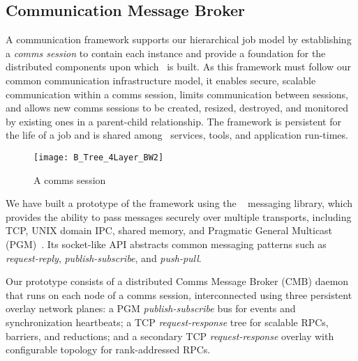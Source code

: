 \subsection{Communication Message Broker}

A communication framework supports our hierarchical job model
by establishing a {\em comms session} to contain each \flux instance
and provide a foundation for the distributed components upon which
\flux\ is built.
As this framework must follow our common communication infrastructure
model, it enables secure, scalable communication
within a comms session, limits communication between sessions,
and allows new comms sessions to be created, resized, destroyed,
and monitored by existing ones in a parent-child relationship.
The framework is persistent for the life of a \flux job and is 
shared among \flux\ services, tools, and application run-times.

\begin{figure}
\centering
\texttt{[image: B\_Tree\_4Layer\_BW2]}
\vspace{.8cm}
\caption{A comms session} 
\vspace{-.5cm}
\label{fig:commswireup}
\end{figure}

We have built a prototype of the framework using the \zMQ~\cite{ZMQGuide}
messaging library, which provides the ability to pass messages securely
over multiple transports, including TCP, UNIX domain IPC, shared memory, and
Pragmatic General Multicast (PGM)~\cite{rfc3208}.
Its socket-like API abstracts common messaging patterns such as
{\em request-reply}, {\em publish-subscribe},
and {\em push-pull}.

Our prototype consists of a distributed Comms Message Broker (CMB)
daemon that runs on each node of a comms session, interconnected using
three persistent overlay network planes:
a PGM {\em publish-subscribe} bus for events and synchronization heartbeats;
a TCP {\em request-response} tree for scalable RPCs, barriers, and reductions; and
a secondary TCP {\em request-response} overlay with configurable topology
for rank-addressed RPCs.


